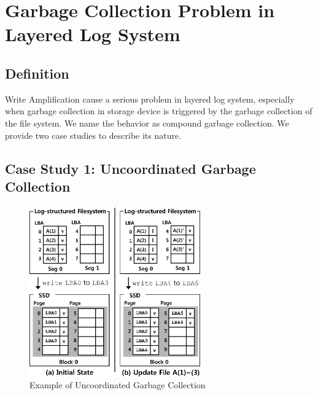 \documentclass[letterpaper,twocolumn,10pt]{article}
\begin{document}
\section{Garbage Collection Problem in Layered Log System}
\label{sec:CompoundGC}
\subsection{Definition}


Write Amplification cause a serious problem in layered log system, especially when garbage collection in storage device is triggered by the garbage collection of the file system. We name the behavior as compound garbage collection. We provide two case studies to describe its nature.

\subsection{Case Study 1: Uncoordinated Garbage Collection}
\label{subsec:case_study_2}

\begin{figure}[h]
\begin{center}
\includegraphics[width=2.9in]{./figure/comp_gc_scenario_2}
\caption{Example of Uncoordinated Garbage Collection}
\label{fig:comp_gc_2}
\end{center}
\end{figure}
\end{document}
